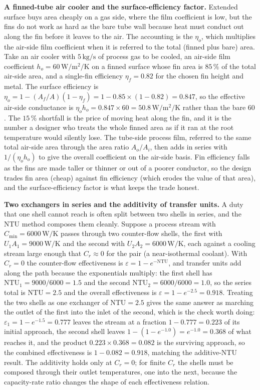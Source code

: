 \textbf{A finned-tube air cooler and the surface-efficiency factor.} Extended
surface buys area cheaply on a gas side, where the film coefficient is low, but
the fins do not work as hard as the bare tube wall because heat must conduct out
along the fin before it leaves to the air. The accounting is the
 $\eta_o$, which multiplies the air-side
film coefficient when it is referred to the total (finned plus bare) area. Take
an air cooler with $5\,\text{kg/s}$ of process gas to be cooled, an air-side
film coefficient $h_o = 60\,\si{\watt\per\meter\squared\per\kelvin}$ on a finned
surface whose fin area is $85\,\%$ of the total air-side area, and a single-fin
efficiency $\eta_f = 0.82$ for the chosen fin height and metal. The surface
efficiency is $\eta_o = 1 - (A_f/A)(1 - \eta_f) = 1 - 0.85\times(1 - 0.82) =
0.847$, so the effective air-side conductance is $\eta_o h_o = 0.847\times 60 =
50.8\,\si{\watt\per\meter\squared\per\kelvin}$ rather than the bare $60$. The
$15\,\%$ shortfall is the price of moving heat along the fin, and it is the
number a designer who treats the whole finned area as if it ran at the root
temperature would silently lose. The tube-side process film, referred to the
same total air-side area through the area ratio $A_o/A_i$, then adds in series
with $1/(\eta_o h_o)$ to give the overall coefficient on the air-side basis. Fin
efficiency falls as the fins are made taller or thinner or out of a poorer
conductor, so the design trades fin area (cheap) against fin efficiency (which
erodes the value of that area), and the surface-efficiency factor is what keeps
the trade honest.

\textbf{Two exchangers in series and the additivity of transfer units.} A duty
that one shell cannot reach is often split between two shells in series, and the
NTU method composes them cleanly. Suppose a process stream with $C_{\min} =
6000\,\si{\watt\per\kelvin}$ passes through two counter-flow shells, the first
with $U_1 A_1 = 9000\,\text{W}/\si{\kelvin}$ and the second with $U_2 A_2 =
6000\,\text{W}/\si{\kelvin}$, each against a cooling stream large enough that
$C_r \approx 0$ for the pair (a near-isothermal coolant). With $C_r = 0$ the
counter-flow effectiveness is $\varepsilon = 1 - e^{-\text{NTU}}$, and transfer
units add along the path because the exponentials multiply: the first shell has
$\text{NTU}_1 = 9000/6000 = 1.5$ and the second $\text{NTU}_2 = 6000/6000 =
1.0$, so the series total is $\text{NTU} = 2.5$ and the overall effectiveness is
$\varepsilon = 1 - e^{-2.5} = 0.918$. Treating the two shells as one exchanger
of $\text{NTU} = 2.5$ gives the same answer as marching the outlet of the first
into the inlet of the second, which is the check worth doing: $\varepsilon_1 = 1
- e^{-1.5} = 0.777$ leaves the stream at a fraction $1 - 0.777 = 0.223$ of its
initial approach, the second shell leaves $1 - (1 - e^{-1.0}) = e^{-1.0} =
0.368$ of what reaches it, and the product $0.223\times 0.368 = 0.082$ is the
surviving approach, so the combined effectiveness is $1 - 0.082 = 0.918$,
matching the additive-NTU result. The additivity holds only at $C_r = 0$; for
finite $C_r$ the shells must be composed through their outlet temperatures, one
into the next, because the capacity-rate ratio changes the shape of each
effectiveness relation.

